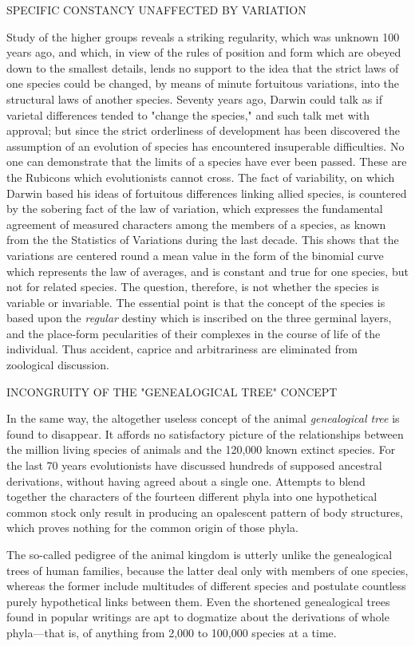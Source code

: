 SPECIFIC CONSTANCY UNAFFECTED BY VARIATION

Study of the higher groups reveals a striking regularity, which was unknown 100 years ago,
and which, in view of the rules of position and form which are obeyed down to the smallest
details, lends no support to the idea that the strict laws of one species could be changed, by
means of minute fortuitous variations, into the structural laws of another species. Seventy
years ago, Darwin could talk as if varietal differences tended to "change the species," and
such talk met with approval; but since the strict orderliness of development has been
discovered the assumption of an evolution of species has encountered insuperable
difficulties. No one can demonstrate that the limits of a species have ever been passed. These
are the Rubicons which evolutionists cannot cross. The fact of variability, on which Darwin
based his ideas of fortuitous differences linking allied species, is countered by the sobering
fact of the law of variation, which expresses the fundamental agreement of measured
characters among the members of a species, as known from the the Statistics of Variations
during the last decade. This shows that the variations are centered round a mean value in the
form of the binomial curve which represents the law of averages, and is constant and true for
one species, but not for related species. The question, therefore, is not whether the species is
variable or invariable. The essential point is that the concept of the species is based upon the
\textit{regular} destiny which is inscribed on the three germinal layers, and the place-form
pecularities of their complexes in the course of life of the individual. Thus accident, caprice
and arbitrariness are eliminated from zoological discussion.

INCONGRUITY OF THE "GENEALOGICAL TREE" CONCEPT

In the same way, the altogether useless concept of the animal \textit{genealogical tree} is found to
disappear. It affords no satisfactory picture of the relationships between the million living
species of animals and the 120,000 known extinct species. For the last 70 years evolutionists
have discussed hundreds of supposed ancestral derivations, without having agreed about a
single one. Attempts to blend together the characters of the fourteen different phyla into one
hypothetical common stock only result in producing an opalescent pattern of body structures,
which proves nothing for the common origin of those phyla.

The so-called pedigree of the animal kingdom is utterly unlike the genealogical trees of
human families, because the latter deal only with members of one species, whereas the
former include multitudes of different species and postulate countless purely hypothetical
links between them. Even the shortened genealogical trees found in popular writings are apt
to dogmatize about the derivations of whole phyla—that is, of anything from 2,000 to
100,000 species at a time.

